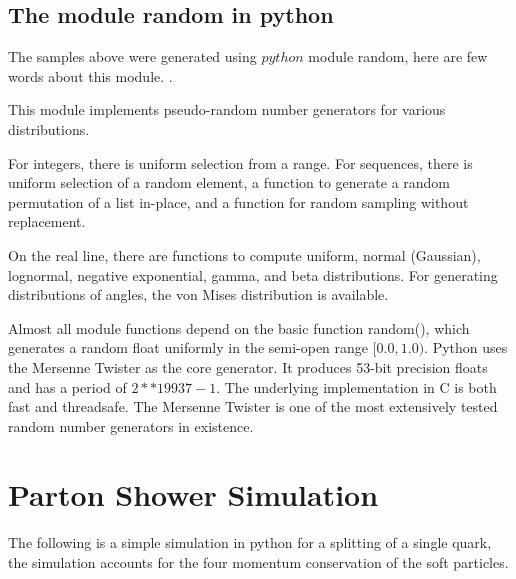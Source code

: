 \subsection{The module random in python}

The samples above were generated using $python$ module random, here are few words about this module.
.
 
This module implements pseudo-random number generators for various distributions.

For integers, there is uniform selection from a range. For sequences, there is uniform selection of a random element, a function to generate a random permutation of a list in-place, and a function for random sampling without replacement.

On the real line, there are functions to compute uniform, normal (Gaussian), lognormal, negative exponential, gamma, and beta distributions. For generating distributions of angles, the von Mises distribution is available.

Almost all module functions depend on the basic function random(), which generates a random float uniformly in the semi-open range $[0.0, 1.0)$. Python uses the Mersenne Twister as the core generator. It produces 53-bit precision floats and has a period of $2**19937-1$.
The underlying implementation in C is both fast and threadsafe.
The Mersenne Twister is one of the most extensively tested random number generators in existence.


\section{Parton Shower Simulation}
The following is a simple simulation in python for a splitting of a single quark, the simulation accounts for the four momentum conservation of the soft particles.

